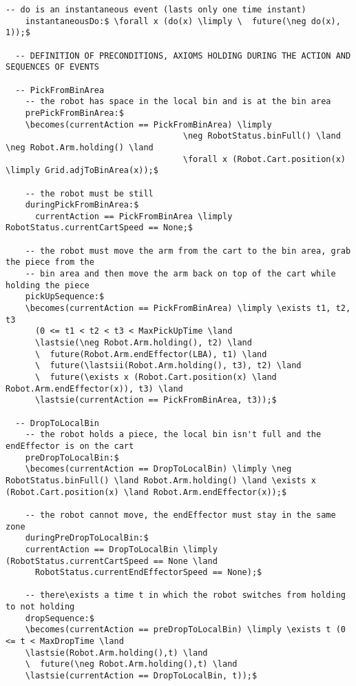\begin{lstlisting}[fontadjust, mathescape, frame=tlb]
    -- do is an instantaneous event (lasts only one time instant)
    instantaneousDo:$ \forall x (do(x) \limply \  future(\neg do(x), 1));$

  -- DEFINITION OF PRECONDITIONS, AXIOMS HOLDING DURING THE ACTION AND SEQUENCES OF EVENTS

  -- PickFromBinArea
    -- the robot has space in the local bin and is at the bin area
    prePickFromBinArea:$
    \becomes(currentAction == PickFromBinArea) \limply
                                    \neg RobotStatus.binFull() \land \neg Robot.Arm.holding() \land
                                    \forall x (Robot.Cart.position(x) \limply Grid.adjToBinArea(x));$

    -- the robot must be still
    duringPickFromBinArea:$
      currentAction == PickFromBinArea \limply RobotStatus.currentCartSpeed == None;$

    -- the robot must move the arm from the cart to the bin area, grab the piece from the
    -- bin area and then move the arm back on top of the cart while holding the piece
    pickUpSequence:$
    \becomes(currentAction == PickFromBinArea) \limply \exists t1, t2, t3
      (0 <= t1 < t2 < t3 < MaxPickUpTime \land
      \lastsie(\neg Robot.Arm.holding(), t2) \land
      \  future(Robot.Arm.endEffector(LBA), t1) \land
      \  future(\lastsii(Robot.Arm.holding(), t3), t2) \land
      \  future(\exists x (Robot.Cart.position(x) \land Robot.Arm.endEffector(x)), t3) \land
      \lastsie(currentAction == PickFromBinArea, t3));$
      
  -- DropToLocalBin
    -- the robot holds a piece, the local bin isn't full and the endEffector is on the cart
    preDropToLocalBin:$
    \becomes(currentAction == DropToLocalBin) \limply \neg RobotStatus.binFull() \land Robot.Arm.holding() \land \exists x (Robot.Cart.position(x) \land Robot.Arm.endEffector(x));$
    
    -- the robot cannot move, the endEffector must stay in the same zone
    duringPreDropToLocalBin:$
    currentAction == DropToLocalBin \limply (RobotStatus.currentCartSpeed == None \land
      RobotStatus.currentEndEffectorSpeed == None);$
  
    -- there\exists a time t in which the robot switches from holding to not holding
    dropSequence:$
    \becomes(currentAction == preDropToLocalBin) \limply \exists t (0 <= t < MaxDropTime \land 
    \lastsie(Robot.Arm.holding(),t) \land 
    \  future(\neg Robot.Arm.holding(),t) \land 
    \lastsie(currentAction == DropToLocalBin, t));$
  

\end{lstlisting}

